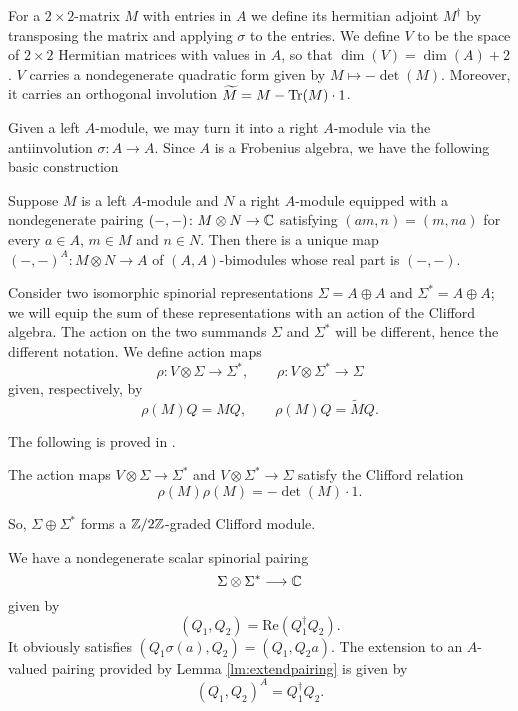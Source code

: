 \documentclass[10pt, oneside]{article}
\renewcommand{\Re}{\mathrm{Re}}
\begin{document}
For a $2\times 2$-matrix $M$ with entries in $A$ we define its hermitian adjoint $M^\dagger$ by transposing the matrix and applying $\sigma$ to the entries. We define $V$ to be the space of $2\times 2$ Hermitian matrices with values in $A$, so that $\dim(V) = \dim(A) + 2$. $V$ carries a nondegenerate quadratic form given by $M\mapsto -\det(M)$. Moreover, it carries an orthogonal involution $\widetilde{M} = M - \operatorname{Tr}(M)\cdot 1$.

Given a left $A$-module, we may turn it into a right $A$-module via the antiinvolution $\sigma\colon A\rightarrow A$. Since $A$ is a Frobenius algebra, we have the following basic construction 

\begin{lemma}
Suppose $M$ is a left $A$-module and $N$ a right $A$-module equipped with a nondegenerate pairing $(-, -)\colon M\otimes N\rightarrow \mathbb C$ satisfying $(am, n) = (m, na)$ for every $a\in A$, $m\in M$ and $n\in N$. Then there is a unique map $(-, -)^A\colon M\otimes N\rightarrow A$ of $(A, A)$-bimodules whose real part is $(-, -)$.
\label{lm:extendpairing}
\end{lemma}

Consider two isomorphic spinorial representations $\Sigma=A\oplus A$ and $\Sigma^* = A\oplus A$; we will equip the sum of these representations with an action of the Clifford algebra.  The action on the two summands $\Sigma$ and $\Sigma^*$ will be different, hence the different notation.  We define action maps
\[\rho \colon V \otimes \Sigma\rightarrow \Sigma^*,\qquad \rho \colon V\otimes \Sigma^*\rightarrow \Sigma\]
given, respectively, by
\[\rho(M)Q = M Q,\qquad \rho(M)Q = \widetilde{M} Q.\]

The following is proved in \cite[Proposition 6]{BaezHuerta}.

\begin{prop}
The action maps $V\otimes \Sigma\rightarrow \Sigma^*$ and $V\otimes \Sigma^*\rightarrow \Sigma$ satisfy the Clifford relation
\[\rho(M)\rho(M) = -\det(M)\cdot 1.\]
\end{prop}

So, $\Sigma\oplus \Sigma^*$ forms a $\mathbb Z/2\mathbb Z$-graded Clifford module.

We have a nondegenerate scalar spinorial pairing
\[\Sigma\otimes \Sigma^*\longrightarrow \mathbb C\]
given by
\[(Q_1, Q_2) = \Re(Q_1^\dagger Q_2).\]
It obviously satisfies $(Q_1 \sigma(a), Q_2) = (Q_1, Q_2 a)$. The extension to an $A$-valued pairing provided by Lemma \ref{lm:extendpairing} is given by
\[(Q_1, Q_2)^A = Q_1^\dagger Q_2.\]
\end{document}
